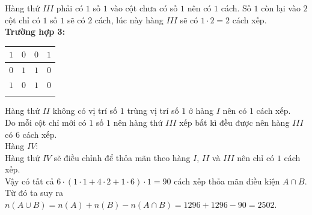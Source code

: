 \begin{ex}
{\begin{enumerate}
			Hàng thứ $III$ phải có $1$ số $1$ vào cột chưa có số $1$ nên có $1$ cách. Số $1$ còn lại vào $2$ cột chỉ có $1$ số $1$ sẽ có $2$ cách, lúc này hàng $III$ sẽ có $1 \cdot 2=2$ cách xếp.\\[4pt]
			\textbf{Trường hợp 3:}
			\begin{center}
				\begin{tabular}{|c|c|c|c|}
					\hline
					$1$ & $0$ & $0$ & $1$ \\ \hline
					$0$ & $1$ & $1$ & $0$ \\ \hline
					$1$ & $0$ & $1$ & $0$ \\ \hline
					& & & \\ \hline
				\end{tabular}
			\end{center}
			Hàng thứ $II$ không có vị trí số $1$ trùng vị trí số $1$ ở hàng $I$ nên có $1$ cách xếp.\\
			Do mỗi cột chỉ mới có $1$ số $1$ nên hàng thứ $III$ xếp bất kì đều được nên hàng $III$ có $6$ cách xếp.\\[4pt]
			Hàng $IV$:\\
			Hàng thứ $IV$ sẽ điều chỉnh để thỏa mãn theo hàng $I$, $II$ và $III$ nên chỉ có $1$ cách xếp.\\
			Vậy có tất cả $6 \cdot (1 \cdot 1+4 \cdot 2+1 \cdot 6) \cdot 1=90$ cách xếp thỏa mãn điều kiện $A \cap B$.\\
			Từ đó ta suy ra $n(A \cup B)=n(A)+n(B)-n(A \cap B)=1296+1296-90=2502$.		
		\end{enumerate}
	}
\end{ex}

